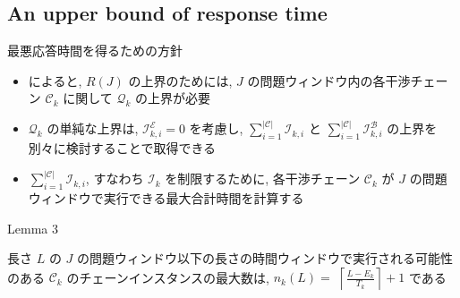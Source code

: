 \subsection{An upper bound of response time}
\label{ssec: an_upper_bound_of_response_time}

\begin{frame}{最悪応答時間を得るための方針}
    \begin{itemize}
        \item {} によると, $R(J)$ の上界のためには, $J$ の問題ウィンドウ内の各干渉チェーン $\mathcal{C}_{k}$ に関して $\mathcal{Q}_{k}$ の上界が必要
        \item $\mathcal{Q}_{k}$ の単純な上界は, $\mathcal{I}_{k, i}^{\mathcal{E}}=0$ を考慮し, $\sum_{i=1}^{|\mathcal{C}|} \mathcal{I}_{k, i}$ と $\sum_{i=1}^{|\mathcal{C}|} \mathcal{I}_{k, i}^{\mathcal{B}}$ の上界を別々に検討することで取得できる
        \item $\sum_{i=1}^{|\mathcal{C}|} \mathcal{I}_{k, i}$, すなわち $\mathcal{I}_{k}$ を制限するために, 各干渉チェーン $\mathcal{C}_{k}$ が $J$ の問題ウィンドウで実行できる最大合計時間を計算する
    \end{itemize}
\end{frame}

\begin{frame}[label=lemma3]{Lemma 3}
    \begin{lemma}[]
        長さ $L$ の $J$ の問題ウィンドウ以下の長さの時間ウィンドウで実行される可能性のある $\mathcal{C}_{k}$ のチェーンインスタンスの最大数は, $n_{k}(L)=$  $\left\lceil\frac{L-E_{k}}{T_{k}}\right\rceil+1$ である
    \end{lemma}
\end{frame}


